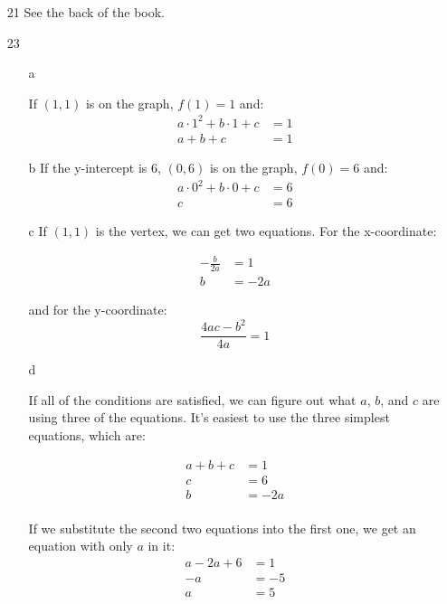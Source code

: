 \documentclass[fleqn,addpoints]{exam}
\begin{document}
\begin{itemize}



\item[21]
See the back of the book.

\item[23]
\begin{itemize}
\item[a]

If $(1, 1)$ is on the graph, $f(1) = 1$ and:
\begin{align*}
  a \cdot 1^2 + b \cdot 1 + c &= 1 \\
  a + b + c &= 1
\end{align*}

\item[b]
If the y-intercept is 6, $(0, 6)$ is on the graph, $f(0) = 6$ and:
\begin{align*}
  a \cdot 0^2 + b \cdot 0 + c &= 6 \\
  c &= 6
\end{align*}

\item[c]
If $(1, 1)$ is the vertex, we can get two equations.  For the x-coordinate:

\begin{align*}
  - \frac{b}{2a} &= 1 \\
  b &= -2a
\end{align*}

and for the y-coordinate:
\[
  \frac{4ac - b^2}{4a} = 1
\]

\item[d]

If all of the conditions are satisfied, we can figure out what $a$, $b$, and $c$ are using three of the equations.  It's
easiest to use the three simplest equations, which are:

\begin{align*}
  a+b+c &= 1 \\
  c &= 6 \\
  b &= -2a \\  
\end{align*}

If we substitute the second two equations into the first one, we get an equation with only $a$ in it:
\begin{align*}
  a-2a+6 &= 1 \\
  -a &= -5 \\
  a &= 5 \\
\end{align*}


\end{itemize}
\end{itemize}
\end{document}
